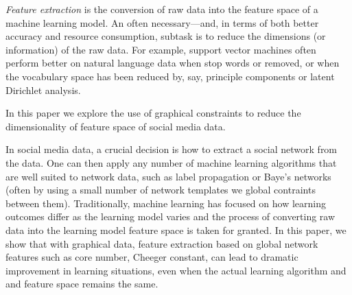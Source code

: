 \documentclass{article}
\begin{document}
\emph{Feature extraction} is the conversion of raw data into the feature space of a machine learning model. 
An often necessary---and, in terms of both better accuracy and resource consumption, subtask is to reduce the dimensions
(or information) of the raw data. For example, support vector machines often perform better on natural language data when stop
words or removed, or when the vocabulary space has been reduced by, say, principle components or latent Dirichlet analysis.

In this paper we explore the use of graphical constraints to reduce the dimensionality of feature space of social media data.


In social media data, a crucial decision is how to extract a social network from the data. One can then apply any number of 
machine learning algorithms that are well suited to network data, such as label propagation or Baye's networks (often by using a small 
number of network templates we global contraints between them). Traditionally, machine learning has focused on how learning
outcomes differ as the learning model varies and the process of converting raw data into the learning model feature space is taken 
for granted. In this paper, we show that with graphical data, feature extraction based on global network features
such as core number, Cheeger constant, can lead to dramatic improvement in learning situations, even when the actual learning algorithm and 
and feature space remains the same. 
\end{document}
